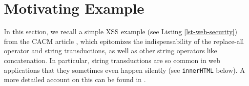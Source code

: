 \section{Motivating Example}
\label{sec:motivation}

In this section, we recall a simple XSS example (see Listing
\ref{lst-web-security}) from the CACM article 
\cite{Kern}, which epitomizes the indispensability of the replace-all operator 
and string transductions, as well as other string operators like concatenation.
In particular, string transductions are so common in web applications that they
sometimes even happen silently (see \texttt{innerHTML} below). A more detailed
account on this can be found in \cite{systematic-transduction}.














